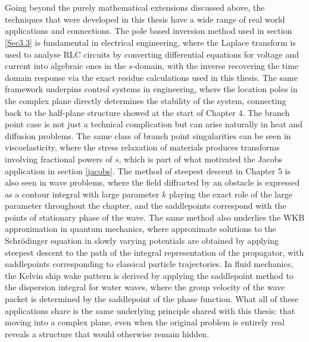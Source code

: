 \\
\\
Going beyond the purely mathematical extensions discussed above, the techniques that were developed in this thesis have a wide range of real world applications and connections. The pole based inversion method used in section \ref{Sec3.3} is fundamental in electrical engineering, where the Laplace transform is used to analyse RLC circuits by converting differential equations for voltage and current into algebraic ones in the $s$-domain, with the inverse recovering the time domain response via the exact residue calculations used in this thesis. The same framework underpins control systems in engineering, where the location poles in the complex plane directly determines the stability of the system, connecting back to the half-plane structure showed at the start of Chapter 4. The branch point case is not just a technical complication but can arise naturally in heat and diffusion problems. The same class of branch point singularities can be seen in viscoelasticity, where the stress relaxation of materials produces transforms involving fractional powers of $s$, which is part of what motivated the Jacobs application in section \ref{jacobs}. The method of steepest descent in Chapter 5 is also seen in wave problems, where the field diffracted by an obstacle is expressed as a contour integral with large parameter $k$ playing the exact role of the large parameter throughout the chapter, and the saddlepoints correspond with the points of stationary phase of the wave. The same method also underlies the WKB approximation in quantum mechanics, where approximate solutions to the Schrödinger equation in slowly varying potentials are obtained by applying steepest descent to the path of the integral representation of the propagator, with saddlepoints corresponding to classical particle trajectories. In fluid mechanics, the Kelvin ship wake pattern is derived by applying the saddlepoint method to the dispersion integral for water waves, where the group velocity of the wave packet is determined by the saddlepoint of the phase function. What all of these applications share is the same underlying principle shared with this thesis: that moving into a complex plane, even when the original problem is entirely real reveals a structure that would otherwise remain hidden.